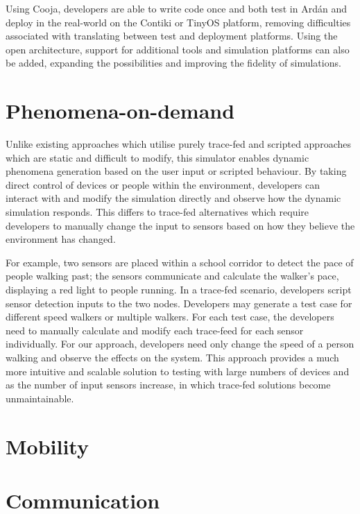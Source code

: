 Using Cooja, developers are able to write code once and both test in Ard\'{a}n and deploy in the real-world on the Contiki or TinyOS platform, removing difficulties associated with translating between test and deployment platforms. Using the open architecture, support for additional tools and simulation platforms can also be added, expanding the possibilities and improving the fidelity of simulations.

\section{Phenomena-on-demand} %
\label{sec:phenomena_on_demand}
Unlike existing approaches which utilise purely trace-fed and scripted approaches which are static and difficult to modify, this simulator enables dynamic phenomena generation based on the user input or scripted behaviour. 
By taking direct control of devices or people within the environment, developers can interact with and modify the simulation directly and observe how the dynamic simulation responds. This differs to trace-fed alternatives which require developers to manually change the input to sensors based on how they believe the environment has changed. 

For example, two sensors are placed within a school corridor to detect the pace of people walking past; the sensors communicate and calculate the walker's pace, displaying a red light to people running. In a trace-fed scenario, developers script sensor detection inputs to the two nodes. Developers may generate a test case for different speed walkers or multiple walkers. For each test case, the developers need to manually calculate and modify each trace-feed for each sensor individually. For our approach, developers need only change the speed of a person walking and observe the effects on the system. This approach provides a much more intuitive and scalable solution to testing with large numbers of devices and as the number of input sensors increase, in which trace-fed solutions become unmaintainable.  

\section{Mobility} %
\label{sec:mobility}

\section{Communication} %
\label{sec:communication}

